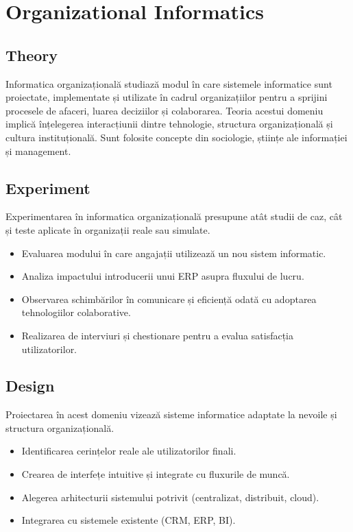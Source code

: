 \documentclass[12pt, letterpaper]{article}
\begin{document}
\newpage
\section{Organizational Informatics}

\subsection*{Theory}
Informatica organizațională studiază modul în care sistemele informatice sunt proiectate, implementate și utilizate în cadrul organizațiilor pentru a sprijini procesele de afaceri, luarea deciziilor și colaborarea. Teoria acestui domeniu implică înțelegerea interacțiunii dintre tehnologie, structura organizațională și cultura instituțională. Sunt folosite concepte din sociologie, științe ale informației și management.

\subsection*{Experiment}
Experimentarea în informatica organizațională presupune atât studii de caz, cât și teste aplicate în organizații reale sau simulate.
\begin{itemize}
    \item Evaluarea modului în care angajații utilizează un nou sistem informatic.
    \item Analiza impactului introducerii unui ERP asupra fluxului de lucru.
    \item Observarea schimbărilor în comunicare și eficiență odată cu adoptarea tehnologiilor colaborative.
    \item Realizarea de interviuri și chestionare pentru a evalua satisfacția utilizatorilor.
\end{itemize}

\subsection*{Design}
Proiectarea în acest domeniu vizează sisteme informatice adaptate la nevoile și structura organizațională.
\begin{itemize}
    \item Identificarea cerințelor reale ale utilizatorilor finali.
    \item Crearea de interfețe intuitive și integrate cu fluxurile de muncă.
    \item Alegerea arhitecturii sistemului potrivit (centralizat, distribuit, cloud).
    \item Integrarea cu sistemele existente (CRM, ERP, BI).
\end{itemize}
\end{document}
